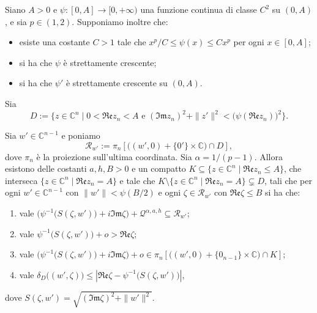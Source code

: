 \begin{lm}\label{6punto4}
    Siano $A>0$ e $\psi:[0,A]\longrightarrow[0,+\infty)$ una funzione continua di classe $C^2$ su $(0,A)$, e sia $p\in(1,2)$. Supponiamo inoltre che:
    \begin{itemize}
        \item esiste una costante $C>1$ tale che $x^p/C\le\psi(x)\le Cx^p$ per ogni $x\in[0,A]$;
        \item si ha che $\psi$ è strettamente crescente;
        \item si ha che $\psi'$ è strettamente crescente su $(0,A)$.
    \end{itemize}

    Sia
    $$D:=\{z\in\mathbb{C}^n\mid 0<\mathfrak{Re}z_n<A\text{ e }(\mathfrak{Im}z_n)^2+\|z'\|^2<\big(\psi(\mathfrak{Re}z_n)\big)^2\}.$$

    Sia $w'\in\mathbb{C}^{n-1}$ e poniamo
    $$\mathcal{R}_{w'}:=\pi_n\left[\big((w',0)+\{0'\}\times\mathbb{C}\big)\cap D\right],$$
    dove $\pi_n$ è la proiezione sull'ultima coordinata. Sia $\alpha=1/(p-1)$. Allora esistono delle costanti $a,h,B>0$ e un compatto $K\subseteq\{z\in\mathbb{C}^n\mid\mathfrak{Re}z_n\le A\}$, che interseca $\{z\in\mathbb{C}^n\mid\mathfrak{Re}z_n=A\}$ e tale che $K\setminus\{z\in\mathbb{C}^n\mid\mathfrak{Re}z_n=A\}\subsetneq D$, tali che per ogni $w'\in\mathbb{C}^{n-1}$ con $\|w'\|<\psi(B/2)$ e ogni $\zeta\in\mathcal{R}_{w'}$ con $\mathfrak{Re}\zeta\le B$ si ha che:
    \begin{enumerate}[label={(\arabic*)}]
        \item vale $\Big(\psi^{-1}\big(S(\zeta,w')\big)+i\mathfrak{Im}\zeta\Big)+\mathcal{Q}^{\alpha,a,h}\subseteq\mathcal{R}_{w'}$;
        \item vale $\psi^{-1}\big(S(\zeta,w')\big)+o>\mathfrak{Re}\zeta$;
        \item vale $\Big(\psi^{-1}\big(S(\zeta,w')\big)+i\mathfrak{Im}\zeta\Big)+o\in\pi_n\left[\big((w',0)+\{0_{n-1}\}\times\mathbb{C}\big)\cap K\right]$;
        \item vale $\delta_D\big((w',\zeta)\big) \le \left|\mathfrak{Re}\zeta-\psi^{-1}\big(S(\zeta,w')\big)\right|$,
    \end{enumerate}
    dove $S(\zeta,w')=\sqrt{(\mathfrak{Im}\zeta)^2+\|w'\|^2}$.
\end{lm}

